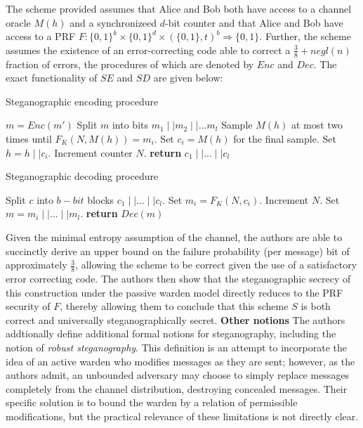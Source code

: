 \documentclass{article}
\begin{document}
The scheme provided assumes that Alice and Bob both have access to a channel oracle $M(h)$ and a synchronizeed 
$d$-bit counter and that Alice and Bob have access to a PRF $F: \{0,1\}^k \times \{0,1\}^d \times (\{0,1\},t)^b \Rightarrow \{0,1\}$.  Further, the scheme assumes the existence of an error-correcting code able to correct a $\frac{3}{8} + negl(n)$ fraction of errors, the procedures of which are denoted by $Enc$ and $Dec$. The exact functionality of $SE$ and $SD$ are given below:

\begin{algorithm}[H]
\caption{Steganographic encoding procedure}\label{1a}
\begin{algorithmic}[1]
\State $m = Enc(m')$
\State Split $m$ into bits $m_1 \mid\mid m_2 \mid\mid ... m_l$
\State Sample $M(h)$ at most two times until $F_K(N,M(h))=m_i$.  Set $c_i = M(h)$ for the final sample.
\State Set $h = h\mid\mid c_i$.
\State Increment counter $N$.
\EndFor
\State \textbf{return} $c_1 \mid\mid...\mid\mid c_l$
\EndProcedure
\end{algorithmic}
\end{algorithm}

\begin{algorithm}[H]
\caption{Steganographic decoding procedure}\label{1a}
\begin{algorithmic}[1]
\State Split $c$ into $b-bit$ blocks $c_1 \mid\mid ... \mid\mid c_l$.
\State Set $m_i = F_K(N, c_i)$.
\State Increment $N$.
\EndFor
\State Set $m = m_i \mid\mid ... \mid\mid m_l$.
\State \textbf{return} $Dec(m)$
\EndProcedure
\end{algorithmic}
\end{algorithm}

Given the minimal entropy assumption of the channel, the authors are able to 
succinctly derive an upper bound on the failure probability (per message) bit 
of approximately $\frac{3}{8}$, allowing the scheme to be correct given the use 
of a satisfactory error correcting code.  The authors then show that the steganographic 
secrecy of this construction under the passive warden model directly reduces to the 
PRF security of $F$, thereby allowing them to conclude that this scheme $S$ is both correct 
and universally steganographically secret.
\newline\newline
\noindent \textbf{Other notions } The authors addtionally define additional formal 
notions for steganography, including the notion of \textit{robust steganography}.
This definition is an attempt to incorporate the idea of an active warden 
who modifies messages as they are sent; however, as the authors admit, an unbounded 
adversary may choose to simply replace messages completely from the channel distribution,
destroying concealed messages.  Their specific solution is to bound the warden by a 
relation of permissible modifications, but the practical relevance of these limitations 
is not directly clear.
\end{document}
